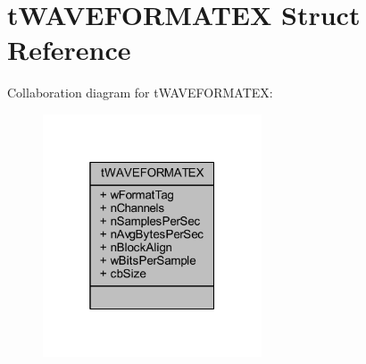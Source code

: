 \hypertarget{structt_w_a_v_e_f_o_r_m_a_t_e_x}{\section{t\-W\-A\-V\-E\-F\-O\-R\-M\-A\-T\-E\-X Struct Reference}
\label{structt_w_a_v_e_f_o_r_m_a_t_e_x}
}


Collaboration diagram for t\-W\-A\-V\-E\-F\-O\-R\-M\-A\-T\-E\-X\-:\nopagebreak
\begin{figure}[H]
\begin{center}
\leavevmode
\includegraphics[width=184pt]{structt_w_a_v_e_f_o_r_m_a_t_e_x__coll__graph}
\end{center}
\end{figure}

